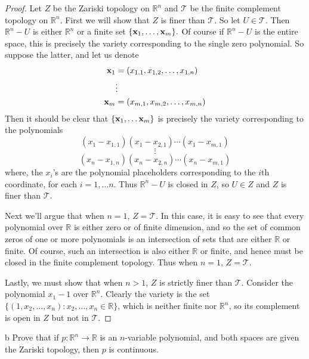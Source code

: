 \documentclass[11pt]{article}
\begin{document}
\begin{proof}
  Let $Z$ be the Zariski topology on $\mathbb{R}^n$ and $\mathcal{T}$ be the
  finite complement topology on $\mathbb{R}^n$. First we will show that
  $Z$ is finer than $\mathcal{T}$. So let $U \in \mathcal{T}$. Then
  $\mathbb{R}^n - U$ is either $\mathbb{R}^n$ or a finite set $\{\vb
  x_1,\ldots,\vb x_m\}.$ Of course if $\mathbb{R}^n - U$ is the entire space,
  this is precisely the variety corresponding to the single zero polynomial. So
  suppose the latter, and let us denote
  \begin{align*}
    \vb x_1 &= (x_{1,1}, x_{1,2}, \ldots, x_{1,n}) \\
            & \vdots \\
    \vb x_m &= (x_{m,1}, x_{m,2}, \ldots, x_{m,n})
  \end{align*}
  Then it should be clear that $\{\vb x_1, \ldots \vb x_m\}$ is precisely the
  variety corresponding to the polynomials
  \[ (x_1 - x_{1,1})(x_1 - x_{2,1}) \cdots (x_1 - x_{m,1}) \]
  \[ \vdots \]
  \[ (x_n - x_{1,n})(x_n - x_{2,n}) \cdots (x_n - x_{m,1}) \]
  where, the $x_i$'s are the polynomial placeholders corresponding to the $i$th
  coordinate, for each $i = 1,\ldots n$. Thus $\mathbb{R}^n - U$ is closed in
  $Z$, so $U \in Z$ and $Z$ is finer than $\mathcal{T}$.

  Next we'll argue that when $n = 1$, $Z = \mathcal{T}$. In this case, it is
  easy to see that every polynomial over $\mathbb{R}$ is either zero or of
  finite dimension, and so the set of common zeros of one or more polynomials is
  an intersection of sets that are either $\mathbb{R}$ or finite. Of course,
  such an intersection is also either $\mathbb{R}$ or finite, and hence must be
  closed in the finite complement topology. Thus when $n = 1$, $Z =
  \mathcal{T}$.

  Lastly, we must show that when $n > 1$, $Z$ is strictly finer than
  $\mathcal{T}$. Consider the polynomial $x_1 - 1$ over $\mathbb{R}^n$. Clearly
  the variety is the set $\{(1,x_2, \ldots, x_n) : x_2, \ldots, x_n \in
  \mathbb{R}\}$, which is neither finite nor $\mathbb{R}^n$, so its complement
  is open in $Z$ but not in $\mathcal{T}$.
\end{proof}

\begin{p}{b}
  Prove that if $p: \mathbb{R}^n \to \mathbb{R}$ is an $n$-variable polynomial,
  and both spaces are given the Zariski topology, then $p$ is continuous.
\end{p}
\end{document}
